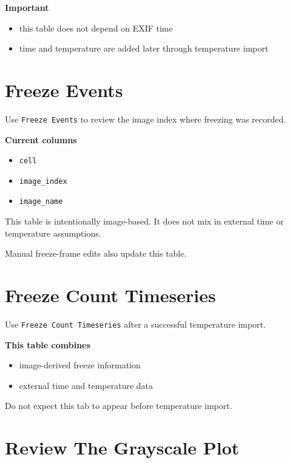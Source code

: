 \documentclass[
  9pt,
  letterpaper,
  oneside,
  open=any,
  DIV=15,
  parskip=half-,
  headings=big,
  numbers=noenddot
]{scrbook}
\newcommand{\manuallead}[1]{%
  \vspace{0.15em}%
  {\sffamily\bfseries\color{ManualBlue}#1}\par\nobreak\vspace{0.05em}%
}
\begin{document}
\manuallead{Important}

\begin{itemize}[leftmargin=*,itemsep=0.35em,topsep=0.4em]
\item this table does not depend on EXIF time
\item time and temperature are added later through temperature import
\end{itemize}

\section{Freeze Events}

Use \texttt{Freeze Events} to review the image index where freezing was recorded.


\manuallead{Current columns}

\begin{itemize}[leftmargin=*,itemsep=0.35em,topsep=0.4em]
\item \texttt{cell}
\item \texttt{image\_index}
\item \texttt{image\_name}
\end{itemize}

This table is intentionally image-based. It does not mix in external time or temperature assumptions.


Manual freeze-frame edits also update this table.


\section{Freeze Count Timeseries}

Use \texttt{Freeze Count Timeseries} after a successful temperature import.


\manuallead{This table combines}

\begin{itemize}[leftmargin=*,itemsep=0.35em,topsep=0.4em]
\item image-derived freeze information
\item external time and temperature data
\end{itemize}

Do not expect this tab to appear before temperature import.


\section{Review The Grayscale Plot}
\end{document}
